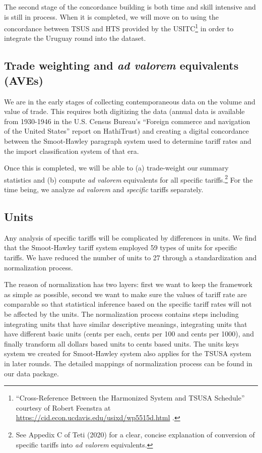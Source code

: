 \documentclass[
  12pt,
]{article}
\begin{document}
The second stage of the concordance building is both time and skill intensive and is still in process. When it is completed, we will move on to using the concordance between TSUS and HTS provided by the USITC\footnote{``Cross-Reference Between the Harmonized System and TSUSA Schedule'' courtesy of Robert Feenstra at \url{https://cid.econ.ucdavis.edu/usixd/wp5515d.html} .} in order to integrate the Uruguay round into the dataset.

\hypertarget{trade-weighting-and-ad-valorem-equivalents-aves}{%
\subsection{\texorpdfstring{Trade weighting and \emph{ad valorem} equivalents (AVEs)}{Trade weighting and ad valorem equivalents (AVEs)}}\label{trade-weighting-and-ad-valorem-equivalents-aves}}

We are in the early stages of collecting contemporaneous data on the volume and value of trade. This requires both digitizing the data (annual data is available from 1930-1946 in the U.S. Census Bureau's ``Foreign commerce and navigation of the United States'' report on HathiTrust) and creating a digital concordance between the Smoot-Hawley paragraph system used to determine tariff rates and the import classification system of that era.

Once this is completed, we will be able to (a) trade-weight our summary statistics and (b) compute \emph{ad valorem} equivalents for all specific tariffs.\footnote{See Appedix C of Teti (2020) for a clear, concise explanation of conversion of specific tariffs into \emph{ad valorem} equivalents.} For the time being, we analyze \emph{ad valorem} and \emph{specific} tariffs separately.

\hypertarget{units}{%
\subsection{Units}\label{units}}

Any analysis of specific tariffs will be complicated by differences in units. We find that the Smoot-Hawley tariff system employed 59 types of units for specific tariffs. We have reduced the number of units to 27 through a standardization and normalization process.

The reason of normalization has two layers: first we want to keep the framework as simple as possible, second we want to make sure the values of tariff rate are comparable so that statistical inference based on the specific tariff rates will not be affected by the units. The normalization process contains steps including integrating units that have similar descriptive meanings, integrating units that have different basic units (cents per each, cents per 100 and cents per 1000), and finally transform all dollars based units to cents based units. The units keys system we created for Smoot-Hawley system also applies for the TSUSA system in later rounds. The detailed mappings of normalization process can be found in our data package.
\end{document}
